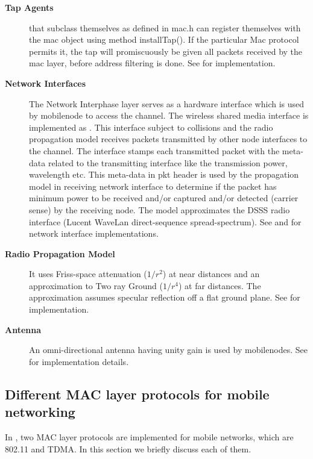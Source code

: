 \begin{description}
\item[{\bf Tap Agents}]  that subclass themselves as
   defined in mac.h can register themselves
  with the mac object using method installTap(). If the particular Mac
  protocol permits it, the tap will promiscuously be 
  given all packets received by the mac layer, before address filtering
  is done. See  for  implementation. 

\item[{\bf Network Interfaces}] The Network Interphase layer serves as
  a hardware interface which is used by mobilenode to access the
  channel. The wireless shared media interface is implemented as
  . This interface
  subject to collisions and the radio propagation model receives
  packets transmitted by other node interfaces to the channel. The
  interface stamps each transmitted packet with the meta-data related
  to the transmitting interface like the transmission power,
  wavelength etc. This meta-data in pkt header is used by the
  propagation model in receiving network interface to determine if the
  packet has minimum power to be received and/or captured and/or
  detected (carrier sense) by the receiving node. The model
  approximates the DSSS radio interface (Lucent WaveLan
  direct-sequence spread-spectrum). See  and
   for network interface implementations.

\item[{\bf Radio Propagation Model}]  It uses Friss-space attenuation
  ($1/r^2$) at near distances and an approximation to Two ray Ground
  ($1/r^4$) at far distances. The approximation assumes specular
  reflection off a flat ground plane. See 
  for implementation.

\item[{\bf Antenna}] An omni-directional antenna having unity gain is 
  used by mobilenodes. See  for implementation
  details. 
\end{description}

\subsection{Different MAC layer protocols for mobile networking}
\label{sec:mobilenode-mac}

In \ns, two MAC layer protocols are implemented for mobile networks,
  which are 802.11 and TDMA.
In this section
  we briefly discuss each of them.

